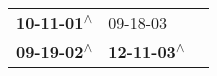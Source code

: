 \begin{supertabular}{lll}
 \textbf{10-11-01\textsuperscript{$\wedge$}} &                   09-18-03\textsuperscript{} \\
 \textbf{09-19-02\textsuperscript{$\wedge$}} &  \textbf{12-11-03\textsuperscript{$\wedge$}} \\
\end{supertabular}

